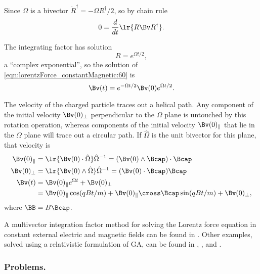 Since \( \Omega \) is a bivector \( \dot{R}^\dagger = -\Omega R^\dagger/2 \), so by chain rule
\begin{dmath}\label{eqn:lorentzForce_constantMagnetic:160}
0
=
\frac{d}{dt} \lr{
R \Bv R^\dagger
}.
\end{dmath}

The integrating factor has solution
\begin{dmath}\label{eqn:lorentzForce_constantMagnetic:180}
R = e^{\Omega t/2},
\end{dmath}
a ``complex exponential'', so the solution of \cref{eqn:lorentzForce_constantMagnetic:60} is
\begin{dmath}\label{eqn:lorentzForce_constantMagnetic:200}
\Bv(t) = e^{-\Omega t/2} \Bv(0) e^{\Omega t/2}.
\end{dmath}

The velocity of the charged particle traces out a helical path.
Any component of the initial velocity \( \Bv(0)_\perp \) perpendicular to the \( \Omega \) plane is untouched by this rotation operation, whereas components of the initial velocity \( \Bv(0)_\parallel \) that lie in the \( \Omega \) plane will trace out a circular path.
If \( \hat{\Omega} \) is the unit bivector for this plane, that velocity is
\begin{dmath}\label{eqn:lorentzForce_constantMagnetic:220}
\begin{aligned}
\Bv(0)_\parallel &= \lr{ \Bv(0) \cdot \hat{\Omega} } \hat{\Omega}^{-1}
                  = (\Bv(0) \wedge \Bcap) \cdot \Bcap \\
\Bv(0)_\perp &= \lr{ \Bv(0) \wedge \hat{\Omega} } \hat{\Omega}^{-1}
              = (\Bv(0) \cdot \Bcap) \Bcap \\
\Bv(t) &=
\Bv(0)_\parallel e^{\Omega t} + \Bv(0)_\perp \\
       &=
\Bv(0)_\parallel \cos( q B t/ m )
+
\Bv(0)_\parallel \cross \Bcap \sin( q B t/ m )
+ \Bv(0)_\perp,
\end{aligned}
\end{dmath}
where \( \BB = B \Bcap \).

A multivector integration factor method for solving the Lorentz force equation in constant external electric and magnetic fields can be found in \citep{hestenes1999nfc}.  Other examples, solved using a relativistic formulation of GA, can be found in \citep{doran2003gap},
\citep{hestenes1974properdynamics}, and
\citep{hestenes1974propermechanics}.

\subsubsection{Problems.}
